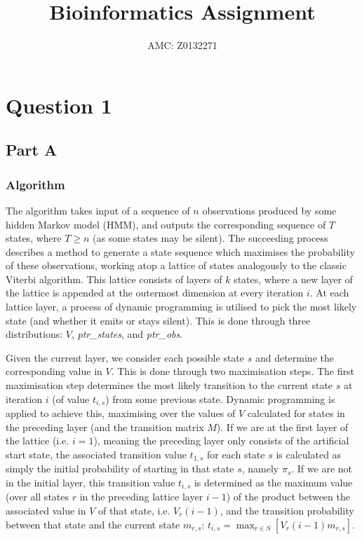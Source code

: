 \documentclass[a4paper, 11pt]{article}
\title{Bioinformatics Assignment}
\author{AMC: Z0132271}
\date{}
\begin{document}
	\maketitle
	\section{Question 1}
	\subsection{Part A}
	\label{section:1A}
	\subsubsection{Algorithm}
	
	The algorithm takes input of a sequence of $n$ observations produced by some hidden Markov model (HMM), and outputs the corresponding sequence of $T$ states, where $T \geq n$ (as some states may be silent). The succeeding process describes a method to generate a state sequence which maximises the probability of these observations, working atop a lattice of states analogously to the classic Viterbi algorithm. This lattice consists of layers of $k$ states, where a new layer of the lattice is appended at the outermost dimension at every iteration $i$. At each lattice layer, a process of dynamic programming is utilised to pick the most likely state (and whether it emits or stays silent). This is done through three distributions: $V$, \emph{ptr\_states}, and \emph{ptr\_obs}. 
	
	Given the current layer, we consider each possible state $s$ and determine the corresponding value in $V$. This is done through two maximisation steps. The first maximisation step determines the most likely transition to the current state $s$ at iteration $i$ (of value $t_{i, s}$) from some previous state. Dynamic programming is applied to achieve this, maximising over the values of $V$ calculated for states in the preceding layer (and the transition matrix $M$). If we are at the first layer of the lattice (i.e. $i = 1$), meaning the preceding layer only consists of the artificial start state, the associated transition value $t_{1, s}$ for each state $s$ is calculated as simply the initial probability of starting in that state $s$, namely $\pi_{s}$. If we are not in the initial layer, this transition value $t_{i, s}$ is determined as the maximum value (over all states $r$ in the preceding lattice layer $i-1$) of the product between the associated value in $V$ of that state, i.e. $V_{r} \left(i - 1 \right)$, and the transition probability between that state and the current state $m_{r, s}$: $t_{i, s} = \max_{r \in S} \left[ V_{r} \left(i - 1 \right) m_{r, s} \right]$. 
	
\end{document}
